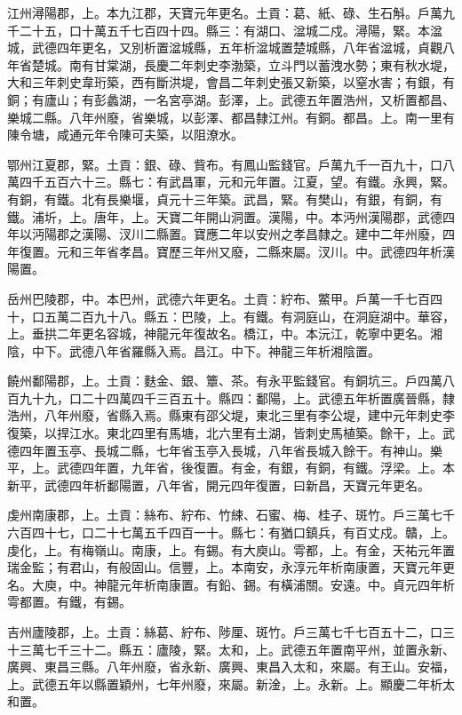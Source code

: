 \begin{pinyinscope}
 江州潯陽郡，上。本九江郡，天寶元年更名。土貢：葛、紙、碌、生石斛。戶萬九千二十五，口十萬五千七百四十四。縣三：有湖口、湓城二戍。潯陽，緊。本湓城，武德四年更名，又別析置湓城縣，五年析湓城置楚城縣，八年省湓城，貞觀八年省楚城。南有甘棠湖，長慶二年刺史李渤築，立斗門以蓄洩水勢；東有秋水堤，大和三年刺史韋珩築，西有斷洪堤，會昌二年刺史張又新築，以窒水害；有銀，有銅；有廬山；有彭蠡湖，一名宮亭湖。彭澤，上。武德五年置浩州，又析置都昌、樂城二縣。八年州廢，省樂城，以彭澤、都昌隸江州。有銅。都昌。上。南一里有陳令塘，咸通元年令陳可夫築，以阻潦水。



 鄂州江夏郡，緊。土貢：銀、碌、貲布。有鳳山監錢官。戶萬九千一百九十，口八萬四千五百六十三。縣七：有武昌軍，元和元年置。江夏，望。有鐵。永興，緊。有銅，有鐵。北有長樂堰，貞元十三年築。武昌，緊。有樊山，有銀，有銅，有鐵。浦圻，上。唐年，上。天寶二年開山洞置。漢陽，中。本沔州漢陽郡，武德四年以沔陽郡之漢陽、汊川二縣置。寶應二年以安州之孝昌隸之。建中二年州廢，四年復置。元和三年省孝昌。寶歷三年州又廢，二縣來屬。汊川。中。武德四年析漢陽置。



 岳州巴陵郡，中。本巴州，武德六年更名。土貢：紵布、鱉甲。戶萬一千七百四十，口五萬二百九十八。縣五：巴陵，上。有鐵。有洞庭山，在洞庭湖中。華容，上。垂拱二年更名容城，神龍元年復故名。橋江，中。本沅江，乾寧中更名。湘陰，中下。武德八年省羅縣入焉。昌江。中下。神龍三年析湘陰置。



 饒州鄱陽郡，上。土貢：麩金、銀、簟、茶。有永平監錢官。有銅坑三。戶四萬八百九十九，口二十四萬四千三百五十。縣四：鄱陽，上。武德五年析置廣晉縣，隸浩州，八年州廢，省縣入焉。縣東有邵父堤，東北三里有李公堤，建中元年刺史李復築，以捍江水。東北四里有馬塘，北六里有土湖，皆刺史馬植築。餘干，上。武德四年置玉亭、長城二縣，七年省玉亭入長城，八年省長城入餘干。有神山。樂平，上。武德四年置，九年省，後復置。有金，有銀，有銅，有鐵。浮梁。上。本新平，武德四年析鄱陽置，八年省，開元四年復置，曰新昌，天寶元年更名。



 虔州南康郡，上。土貢：絲布、紵布、竹綀、石蜜、梅、桂子、斑竹。戶三萬七千六百四十七，口二十七萬五千四百一十。縣七：有猶口鎮兵，有百丈戍。贛，上。虔化，上。有梅嶺山。南康，上。有錫。有大庾山。雩都，上。有金，天祐元年置瑞金監；有君山，有般固山。信豐，上。本南安，永淳元年析南康置，天寶元年更名。大庾，中。神龍元年析南康置。有鉛、錫。有橫浦關。安遠。中。貞元四年析雩都置。有鐵，有錫。



 吉州廬陵郡，上。土貢：絲葛、紵布、陟厘、斑竹。戶三萬七千七百五十二，口三十三萬七千三十二。縣五：廬陵，緊。太和，上。武德五年置南平州，並置永新、廣興、東昌三縣。八年州廢，省永新、廣興、東昌入太和，來屬。有王山。安福，上。武德五年以縣置穎州，七年州廢，來屬。新淦，上。永新。上。顯慶二年析太和置。




\end{pinyinscope}
